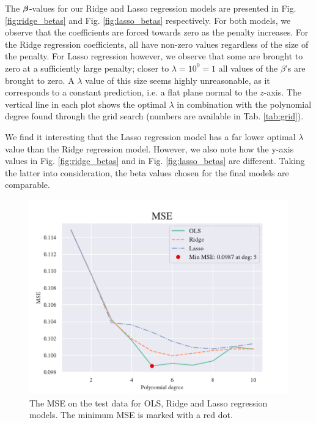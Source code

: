 The $\boldsymbol{\beta}$-values for our Ridge and Lasso regression models are presented in Fig. \ref{fig:ridge_betas} and Fig. \ref{fig:lasso_betas} respectively. 
For both models, we observe that the coefficients are forced towards zero as the penalty increases. 
For the Ridge regression coefficients, all have non-zero values regardless of the size of the penalty. 
For Lasso regression however, we observe that some are brought to zero at a sufficiently large penalty; 
closer to $\lambda = 10^0 = 1$ all values of the $\beta$'s are brought to zero. 
A $\lambda$ value of this size seems highly unreasonable, as it corresponds to a constant prediction, i.e. a flat plane normal to the $z$-axis.
The vertical line in each plot shows the optimal $\lambda$ in combination with the polynomial degree found through the grid search (numbers are available in Tab. \ref{tab:grid}). 

We find it interesting that the Lasso regression model has a far lower optimal $\lambda$ value than the Ridge regression model.
However, we also note how the y-axis values in Fig. \ref{fig:ridge_betas} and in Fig. \ref{fig:lasso_betas} are different. 
Taking the latter into consideration, the beta values chosen for the final models are comparable. 

\begin{figure}[h!]
    \centering
    \includegraphics[width=1\linewidth]{project_1/figures/figures_in_report/OLS_Ridge_Lasso_Franke_Noise.pdf}
    \caption{The MSE on the test data for OLS, Ridge and Lasso regression models. The minimum MSE is marked with a red dot.}
    \label{all3franke}
\end{figure}

